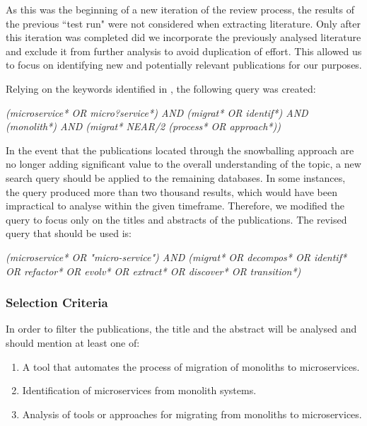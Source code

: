 As this was the beginning of a new iteration of the review process, the results
of the previous ``test run" were not considered when extracting literature.
Only after this iteration was completed did we incorporate the previously
analysed literature and exclude it from further analysis to avoid duplication
of effort. This allowed us to focus on identifying new and potentially relevant
publications for our purposes.

Relying on the keywords identified in , the following
query was created:

\begin{center}
  \emph{(microservice* OR micro?service*) AND (migrat* OR identif*) AND
  (monolith*) AND (migrat* NEAR/2 (process* OR approach*))}
\end{center}

In the event that the publications located through the snowballing approach are
no longer adding significant value to the overall understanding of the topic, a
new search query should be applied to the remaining databases. In some
instances, the query produced more than two thousand results, which would have
been impractical to analyse within the given timeframe. Therefore, we modified
the query to focus only on the titles and abstracts of the publications. The
revised query that should be used is:

\begin{center}
  \emph{(microservice* OR "micro-service") AND (migrat* OR decompos* OR
  identif* OR refactor* OR evolv* OR extract* OR discover* OR transition*)}
\end{center}

\subsubsection{Selection Criteria} \label{sub:selection-criteria}

In order to filter the publications, the title and the abstract will be
analysed and should mention at least one of:

\begin{enumerate}[{IC}1.]
  \item A tool that automates the process of migration of monoliths to
    microservices.
  \item Identification of microservices from monolith systems.
  \item Analysis of tools or approaches for migrating from monoliths to
    microservices.
\end{enumerate}

